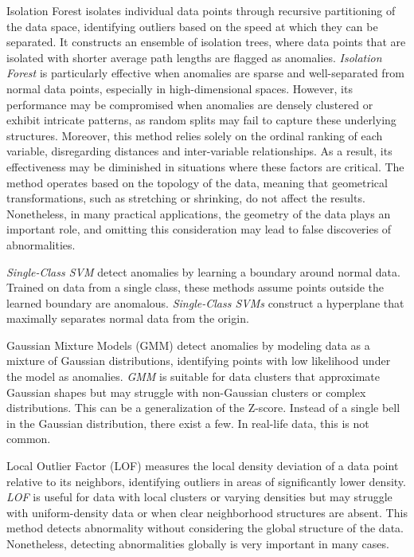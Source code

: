 Isolation Forest \cite{cheng2019outlier} isolates individual data points through recursive partitioning of the data space, identifying outliers based on the speed at which they can be separated. It constructs an ensemble of isolation trees, where data points that are isolated with shorter average path lengths are flagged as anomalies. \textit{Isolation Forest} is particularly effective when anomalies are sparse and well-separated from normal data points, especially in high-dimensional spaces. However, its performance may be compromised when anomalies are densely clustered or exhibit intricate patterns, as random splits may fail to capture these underlying structures. Moreover, this method relies solely on the ordinal ranking of each variable, disregarding distances and inter-variable relationships. As a result, its effectiveness may be diminished in situations where these factors are critical. The method operates based on the topology of the data, meaning that geometrical transformations, such as stretching or shrinking, do not affect the results. Nonetheless, in many practical applications, the geometry of the data plays an important role, and omitting this consideration may lead to false discoveries of abnormalities.

\textit{Single-Class SVM} \cite{shin2005one,oza2018one} detect anomalies by learning a boundary around normal data. Trained on data from a single class, these methods assume points outside the learned boundary are anomalous. \textit{Single-Class SVMs} construct a hyperplane that maximally separates normal data from the origin.

Gaussian Mixture Models (GMM) \cite{li2016anomaly} detect anomalies by modeling data as a mixture of Gaussian distributions, identifying points with low likelihood under the model as anomalies. \textit{GMM} is suitable for data clusters that approximate Gaussian shapes but may struggle with non-Gaussian clusters or complex distributions. This can be a generalization of the Z-score. Instead of a single bell in the Gaussian distribution, there exist a few. In real-life data, this is not common. 

Local Outlier Factor (LOF) \cite{alghushairy2020review} measures the local density deviation of a data point relative to its neighbors, identifying outliers in areas of significantly lower density. \textit{LOF} is useful for data with local clusters or varying densities but may struggle with uniform-density data or when clear neighborhood structures are absent. This method detects abnormality without considering the global structure of the data. Nonetheless, detecting abnormalities globally is very important in many cases. 

